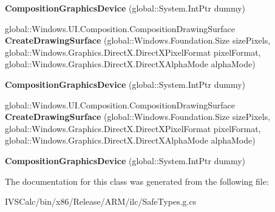 \begin{DoxyCompactItemize}
\item 
\mbox{\label{class_windows_1_1_u_i_1_1_composition_1_1_composition_graphics_device_ad669d790e4fa24aa3b6ad0b412250a00}} 
{\bfseries Composition\+Graphics\+Device} (global\+::\+System.\+Int\+Ptr dummy)
\item 
\mbox{\label{class_windows_1_1_u_i_1_1_composition_1_1_composition_graphics_device_a0a3fdd5fc870a487451732595e327ea4}} 
global\+::\+Windows.\+U\+I.\+Composition.\+Composition\+Drawing\+Surface {\bfseries Create\+Drawing\+Surface} (global\+::\+Windows.\+Foundation.\+Size size\+Pixels, global\+::\+Windows.\+Graphics.\+Direct\+X.\+Direct\+X\+Pixel\+Format pixel\+Format, global\+::\+Windows.\+Graphics.\+Direct\+X.\+Direct\+X\+Alpha\+Mode alpha\+Mode)
\item 
\mbox{\label{class_windows_1_1_u_i_1_1_composition_1_1_composition_graphics_device_ad669d790e4fa24aa3b6ad0b412250a00}} 
{\bfseries Composition\+Graphics\+Device} (global\+::\+System.\+Int\+Ptr dummy)
\item 
\mbox{\label{class_windows_1_1_u_i_1_1_composition_1_1_composition_graphics_device_a0a3fdd5fc870a487451732595e327ea4}} 
global\+::\+Windows.\+U\+I.\+Composition.\+Composition\+Drawing\+Surface {\bfseries Create\+Drawing\+Surface} (global\+::\+Windows.\+Foundation.\+Size size\+Pixels, global\+::\+Windows.\+Graphics.\+Direct\+X.\+Direct\+X\+Pixel\+Format pixel\+Format, global\+::\+Windows.\+Graphics.\+Direct\+X.\+Direct\+X\+Alpha\+Mode alpha\+Mode)
\item 
\mbox{\label{class_windows_1_1_u_i_1_1_composition_1_1_composition_graphics_device_ad669d790e4fa24aa3b6ad0b412250a00}} 
{\bfseries Composition\+Graphics\+Device} (global\+::\+System.\+Int\+Ptr dummy)
\end{DoxyCompactItemize}


The documentation for this class was generated from the following file\+:\begin{DoxyCompactItemize}
\item 
I\+V\+S\+Calc/bin/x86/\+Release/\+A\+R\+M/ilc/Safe\+Types.\+g.\+cs\end{DoxyCompactItemize}
